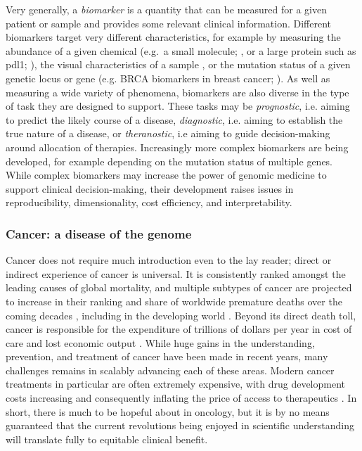 \documentclass[thesis.tex]{subfiles}
\begin{document}
Very generally, a \emph{biomarker} is a quantity that can be measured for a given patient or sample and provides some relevant clinical information. Different biomarkers target very different characteristics, for example by measuring the abundance of a given chemical (e.g.~a small molecule; \citealp{qiu_small_2023}, or a large protein such as \gls{pdl1}; \citealp{doroshow_pd-l1_2021}), the visual characteristics of a sample \citep{smith_biomarkers_2003}, or the mutation status of a given genetic locus or gene (e.g. BRCA biomarkers in breast cancer; \citealp{walsh_genomic_2016}). As well as measuring a wide variety of phenomena, biomarkers are also diverse in the type of task they are designed to support. These tasks may be \emph{prognostic}, i.e. aiming to predict the likely course of a disease, \emph{diagnostic}, i.e. aiming to establish the true nature of a disease, or \emph{theranostic}, i.e aiming to guide decision-making around allocation of therapies. Increasingly more complex biomarkers are being developed, for example depending on the mutation status of multiple genes. While complex biomarkers may increase the power of genomic medicine to support clinical decision-making, their development raises issues in reproducibility, dimensionality, cost efficiency, and interpretability.

\subsubsection{Cancer: a disease of the genome}
Cancer does not require much introduction even to the lay reader; direct or indirect experience of cancer is universal. It is consistently ranked amongst the leading causes of global mortality, and multiple subtypes of cancer are projected to increase in their ranking and share of worldwide premature deaths over the coming decades \citep{mathers_projections_2006}, including in the developing world \citep{kanavos_rising_2006}. Beyond its direct death toll, cancer is responsible for the expenditure of trillions of dollars per year in cost of care and lost economic output \citep{wild_world_2020}. While huge gains in the understanding, prevention, and treatment of cancer have been made in recent years, many challenges remains in scalably advancing each of these areas. Modern cancer treatments in particular are often extremely expensive, with drug development costs increasing and consequently inflating the price of access to therapeutics \citep{howard_pricing_2015}. In short, there is much to be hopeful about in oncology, but it is by no means guaranteed that the current revolutions being enjoyed in scientific understanding will translate fully to equitable clinical benefit.
\end{document}
